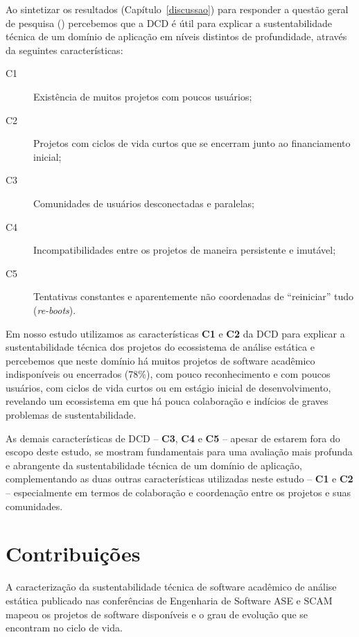 Ao sintetizar os resultados (Capítulo~\ref{discussao}) para responder a questão
geral de pesquisa ({\it \QuestaoGeralUm}) percebemos que a DCD é útil para
explicar a sustentabilidade técnica de um domínio de aplicação em níveis
distintos de profundidade, através da seguintes características:

\begin{description}
  \item [C1] Existência de muitos projetos com poucos usuários;
  \item [C2] Projetos com ciclos de vida curtos que se encerram junto ao financiamento inicial;
  \item [C3] Comunidades de usuários desconectadas e paralelas;
  \item [C4] Incompatibilidades entre os projetos de maneira persistente e imutável;
  \item [C5] Tentativas constantes e aparentemente não coordenadas de ``reiniciar'' tudo ({\it re-boots}).
\end{description}

Em nosso estudo utilizamos as características {\bf C1} e {\bf C2} da DCD para
explicar a sustentabilidade técnica dos projetos do ecossistema de análise
estática e percebemos que neste domínio há muitos projetos de software
acadêmico indisponíveis ou encerrados (78\%), com pouco reconhecimento e com
poucos usuários, com ciclos de vida curtos ou em estágio inicial de
desenvolvimento, revelando um ecossistema em que há pouca colaboração e
indícios de graves problemas de sustentabilidade.

As demais características de DCD -- {\bf C3}, {\bf C4} e {\bf C5} -- apesar de
estarem fora do escopo deste estudo, se mostram fundamentais para uma avaliação
mais profunda e abrangente da sustentabilidade técnica de um domínio de
aplicação, complementando as duas outras características utilizadas neste
estudo -- {\bf C1} e {\bf C2} -- especialmente em termos de colaboração e
coordenação entre os projetos e suas comunidades.

\section{Contribuições}

A caracterização da sustentabilidade técnica de software acadêmico de análise estática
publicado nas conferências de Engenharia de Software ASE e SCAM 
mapeou os projetos de software disponíveis e o grau de evolução que
se encontram no ciclo de vida.

